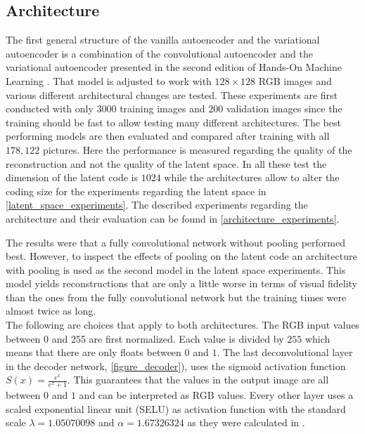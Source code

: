 \subsection{Architecture} \label{architecture}

The first general structure of the vanilla autoencoder and the variational autoencoder is a combination 
of the convolutional autoencoder and the variational autoencoder presented in the second edition of
Hands-On Machine Learning \parencite{2017-geron-homl}.
That model is adjusted to work with $128\times 128$ RGB images and various different architectural
changes are tested. These experiments are first conducted with only $3000$ training images and $200$ validation
images since the training should be fast to allow testing many different architectures. The best performing
models are then evaluated and compared after training with all $178,122$ pictures. 
Here the performance is measured regarding the quality of the reconstruction and not the quality of the latent space.
In all these test the dimension
of the latent code is $1024$ while the architectures allow to alter the coding size for the experiments regarding
the latent space in \autoref{latent_space_experiments}. The described experiments regarding the architecture and their
evaluation can be found
in \autoref{architecture_experiments}.

The results were that a fully convolutional network without pooling performed best. However, to inspect the 
effects of pooling on the latent code an architecture with pooling is used as the second model in the latent space
experiments. This model yields reconstructions that are only a little worse in terms of visual fidelity
than the ones from the fully convolutional
network but the training times were almost twice as long.\\

The following are choices that apply to both architectures. The RGB input values between 0 and 255 are first 
normalized. Each value is divided by $255$ which means that there are only floats between $0$ and $1$.
The last deconvolutional layer in the decoder network, \autoref{figure_decoder}), uses the sigmoid activation
function $S(x) = \frac{e^x}{e^x+1}$. This guarantees that the values in the output image are all 
between $0$ and $1$ and can be interpreted as RGB values. 
Every other layer uses a scaled exponential linear unit (SELU) as activation function with the standard scale
$\lambda = 1.05070098$ and $\alpha = 1.67326324$ as they were calculated in \parencite{2017-klambauer-selu}.

